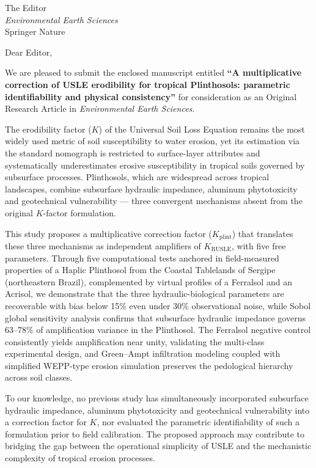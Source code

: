 \documentclass[11pt,a4paper]{letter}
\date{\today}
\begin{document}
\begin{letter}{The Editor\\
\textit{Environmental Earth Sciences}\\
Springer Nature}

\opening{Dear Editor,}

We are pleased to submit the enclosed manuscript entitled \textbf{``A multiplicative correction of USLE erodibility for tropical Plinthosols: parametric identifiability and physical consistency''} for consideration as an Original Research Article in \textit{Environmental Earth Sciences}.

The erodibility factor ($K$) of the Universal Soil Loss Equation remains the most widely used metric of soil susceptibility to water erosion, yet its estimation via the standard nomograph is restricted to surface-layer attributes and systematically underestimates erosive susceptibility in tropical soils governed by subsurface processes. Plinthosols, which are widespread across tropical landscapes, combine subsurface hydraulic impedance, aluminum phytotoxicity and geotechnical vulnerability --- three convergent mechanisms absent from the original $K$-factor formulation.

This study proposes a multiplicative correction factor ($K_{\mathrm{plint}}$) that translates these three mechanisms as independent amplifiers of $K_{\mathrm{RUSLE}}$, with five free parameters. Through five computational tests anchored in field-measured properties of a Haplic Plinthosol from the Coastal Tablelands of Sergipe (northeastern Brazil), complemented by virtual profiles of a Ferralsol and an Acrisol, we demonstrate that the three hydraulic-biological parameters are recoverable with bias below 15\% even under 30\% observational noise, while Sobol global sensitivity analysis confirms that subsurface hydraulic impedance governs 63--78\% of amplification variance in the Plinthosol. The Ferralsol negative control consistently yields amplification near unity, validating the multi-class experimental design, and Green--Ampt infiltration modeling coupled with simplified WEPP-type erosion simulation preserves the pedological hierarchy across soil classes.

To our knowledge, no previous study has simultaneously incorporated subsurface hydraulic impedance, aluminum phytotoxicity and geotechnical vulnerability into a correction factor for $K$, nor evaluated the parametric identifiability of such a formulation prior to field calibration. The proposed approach may contribute to bridging the gap between the operational simplicity of USLE and the mechanistic complexity of tropical erosion processes.


\end{letter}
\end{document}
